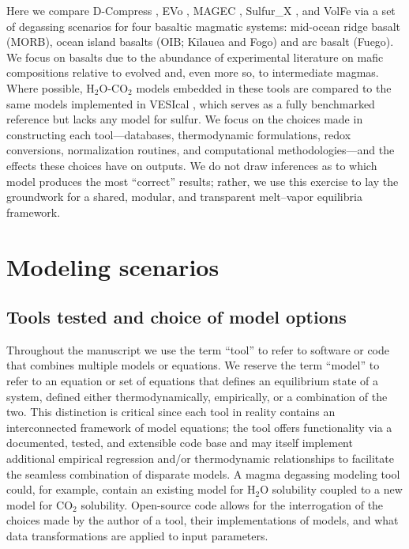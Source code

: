 \documentclass[draft, english]{volcanica-template}
\begin{document}
Here we compare D-Compress \parencite{Burgisser2015}, EVo \parencite{Liggins2020, Liggins2022}, MAGEC \parencite{Sun2022, Sun2024}, Sulfur\_X \parencite{Ding2023}, and VolFe \parencite{hughes2024,Hughes2025volfe} via a set of degassing scenarios for four basaltic magmatic systems: mid-ocean ridge basalt (MORB), ocean island basalts (OIB; Kīlauea and Fogo) and arc basalt (Fuego). We focus on basalts due to the abundance of experimental literature on mafic compositions relative to evolved and, even more so, to intermediate magmas. Where possible, H$_2$O-CO$_2$ models embedded in these tools are compared to the same models implemented in VESIcal \parencite{Iacovino2021}, which serves as a fully benchmarked reference but lacks any model for sulfur. We focus on the choices made in constructing each tool—databases, thermodynamic formulations, redox conversions, normalization routines, and computational methodologies—and the effects these choices have on outputs. We do not draw inferences as to which model produces the most ``correct'' results; rather, we use this exercise to lay the groundwork for a shared, modular, and transparent melt–vapor equilibria framework.

\section{Modeling scenarios}
\subsection{Tools tested and choice of model options}
\label{sec:modelcomparisons}
Throughout the manuscript we use the term ``tool'' to refer to software or code that combines multiple models or equations. We reserve the term ``model'' to refer to an equation or set of equations that defines an equilibrium state of a system, defined either thermodynamically, empirically, or a combination of the two. This distinction is critical since each tool in reality contains an interconnected framework of model equations; the tool offers functionality via a documented, tested, and extensible code base and may itself implement additional empirical regression and/or thermodynamic relationships to facilitate the seamless combination of disparate models. A magma degassing modeling tool could, for example, contain an existing model for H$_2$O solubility coupled to a new model for CO$_2$ solubility. Open-source code allows for the interrogation of the choices made by the author of a tool, their implementations of models, and what data transformations are applied to input parameters. 
\end{document}
